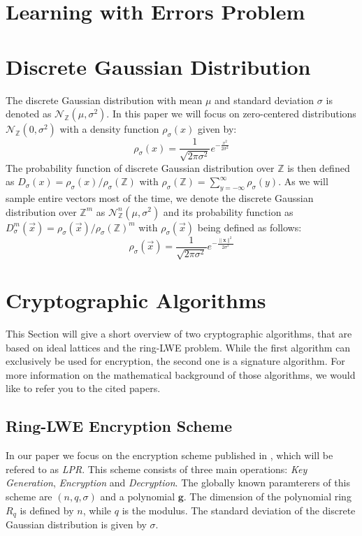 \section{Learning with Errors Problem}

\section{Discrete Gaussian Distribution}
The discrete Gaussian distribution with mean \(\mu\) and standard deviation \(\sigma\) is denoted as \(\mathcal{N}_\mathbb{Z} (\mu, \sigma^2)\). In this paper we will focus on zero-centered distributions \(\mathcal{N}_\mathbb{Z} (0, \sigma^2)\) with a density function \(\rho_\sigma(x)\) given by:
\begin{equation}
	\rho_\sigma(x)=\frac{1}{\sqrt{2\pi \sigma^2}}e^{-\frac{x^2}{2\sigma^2}}
\end{equation}
The probability function of discrete Gaussian distribution over \(\mathbb{Z}\) is then defined as \(D_\sigma(x)=\rho_\sigma(x)/\rho_\sigma(\mathbb{Z})\) with \(\rho_\sigma(\mathbb{Z})=\sum_{y=-\infty}^{\infty} \rho_\sigma(y)\). As we will sample entire vectors most of the time, we denote the discrete Gaussian distribution over \(\mathbb{Z}^m\) as \(\mathcal{N}_\mathbb{Z}^{n} (\mu, \sigma^2)\) and its probability function as \(D_\sigma^m(\vec{x})=\rho_\sigma(\vec{x})/\rho_\sigma(\mathbb{Z})^m\) with \(\rho_\sigma(\vec{x})\) being defined as follows:
\begin{equation}
	\rho_\sigma(\vec{x})=\frac{1}{\sqrt{2\pi \sigma^2}}e^{-\frac{\|\textbf{x}\|^2}{2\sigma^2}}
\end{equation}

\section{Cryptographic Algorithms}
This Section will give a short overview of two cryptographic algorithms, that are based on ideal lattices and the \ac{ring-LWE} problem. While the first algorithm can exclusively be used for encryption, the second one is a signature algorithm. For more information on the mathematical background of those algorithms, we would like to refer you to the cited papers.

\subsection{Ring-LWE Encryption Scheme}
In our paper we focus on the encryption scheme published in \cite{cryptoeprint:2012:230}, which will be refered to as \textit{\ac{LPR}}. This scheme consists of three main operations: \textit{Key Generation}, \textit{Encryption} and \textit{Decryption}. The globally known paramterers of this scheme are \((n, q, \sigma)\) and a polynomial \(\textbf{g}\). The dimension of the polynomial ring \(R_q\) is defined by \(n\), while \(q\) is the modulus. The standard deviation of the discrete Gaussian distribution is given by \(\sigma\).

